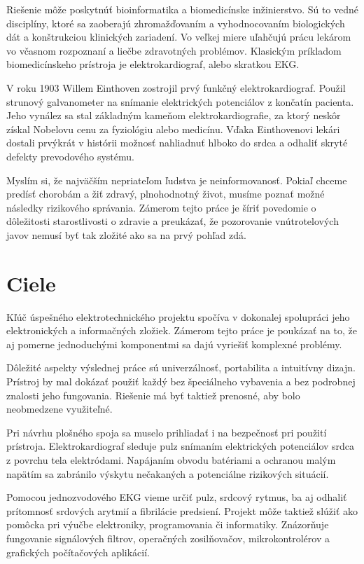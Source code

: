 \documentclass[titlepage,12pt]{article}
\begin{document}
Riešenie môže poskytnúť bioinformatika a biomedicínske inžinierstvo. Sú to vedné disciplíny, ktoré sa zaoberajú zhromažďovaním a vyhodnocovaním biologických dát a konštrukciou klinických zariadení. Vo veľkej miere uľahčujú prácu lekárom vo včasnom rozpoznaní a liečbe zdravotných problémov. Klasickým príkladom biomedicínskeho prístroja je elektrokardiograf, alebo skratkou EKG. 

V roku 1903 Willem Einthoven zostrojil prvý funkčný elektrokardiograf. Použil strunový galvanometer na snímanie elektrických potenciálov z končatín pacienta. Jeho vynález sa stal základným kameňom elektrokardiografie, za ktorý neskôr získal Nobelovu cenu za fyziológiu alebo medicínu. Vďaka Einthovenovi lekári dostali prvýkrát v histórii možnosť nahliadnuť hlboko do srdca a odhaliť skryté defekty prevodového systému.

Myslím si, že najväčším nepriateľom ľudstva je neinformovanosť. Pokiaľ chceme predísť chorobám a žiť zdravý, plnohodnotný život, musíme poznať možné následky rizikového správania. Zámerom tejto práce je šíriť povedomie o dôležitosti starostlivosti o zdravie a preukázať, že pozorovanie vnútrotelových javov nemusí byť tak zložité ako sa na prvý pohľad zdá. 



\newpage
\section{Ciele}
Kľúč úspešného elektrotechnického projektu spočíva v dokonalej spolupráci jeho elektronických a informačných zložiek. Zámerom tejto práce je poukázať na to, že aj pomerne jednoduchými komponentmi sa dajú vyriešiť komplexné problémy. 

Dôležité aspekty výslednej práce sú univerzálnosť, portabilita a intuitívny dizajn. Prístroj by mal dokázať použiť každý bez špeciálneho vybavenia a bez podrobnej znalosti jeho fungovania. Riešenie má byť taktiež prenosné, aby bolo neobmedzene využiteľné.

Pri návrhu plošného spoja sa muselo prihliadať i na bezpečnosť pri použití prístroja. Elektrokardiograf sleduje pulz snímaním elektrických potenciálov srdca z povrchu tela elektródami. Napájaním obvodu batériami a ochranou malým napätím sa zabránilo výskytu nečakaných a potenciálne rizikových situácií.

Pomocou jednozvodového EKG vieme určiť pulz, srdcový rytmus, ba aj odhaliť prítomnosť srdových arytmií a fibrilácie predsiení. Projekt môže taktiež slúžiť ako pomôcka pri výučbe elektroniky, programovania či informatiky. Znázorňuje fungovanie signálových filtrov, operačných zosilňovačov, mikrokontrolérov a grafických počítačových aplikácií.
\end{document}
